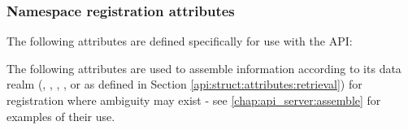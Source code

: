 \subsubsection{Namespace registration attributes}
\label{api:struct:attributes:storage}

The following attributes are defined specifically for use with the  \ac{API}:
%

\vspace{\baselineskip}
The following attributes are used to assemble information according to its data realm (, , , , or  as defined in Section \ref{api:struct:attributes:retrieval}) for registration where ambiguity may exist - see \ref{chap:api_server:assemble} for examples of their use.

